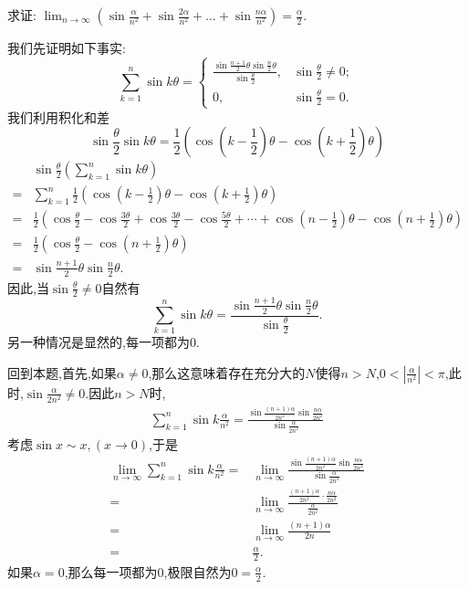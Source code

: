 \begin{exercise}[1.3.7]
    求证: $\lim_{n \to \infty} \left(\sin\frac{\alpha}{n^2} + \sin\frac{2\alpha}{n^2} + \dots + \sin\frac{n\alpha}{n^2}\right) = \frac{\alpha}{2}$.
\end{exercise}

\begin{solution}
    我们先证明如下事实:
    $$
        \sum_{k=1}^n \sin k \theta =\begin{cases}
            \frac{\sin\frac{n+1}{2}\theta\sin\frac{n}{2}\theta}{\sin \frac{\theta}{2}}, & \sin \frac{\theta}{2} \ne 0; \\
            0, & \sin \frac{\theta}{2} = 0.
        \end{cases}
    $$
    我们利用积化和差$$\sin \frac{\theta}{2}\sin k\theta = \frac{1}{2}\left(\cos\left(k-\frac{1}{2}\right)\theta-\cos\left(k+\frac{1}{2}\right)\theta\right)$$
    \begin{align*}
        &\sin \frac{\theta}{2}\left(\sum_{k=1}^n \sin k \theta \right)\\
        =&\sum_{k=1}^n \frac{1}{2}\left(\cos\left(k-\frac{1}{2}\right)\theta-\cos\left(k+\frac{1}{2}\right)\theta\right) \\
        =&\frac{1}{2}\left(\cos \frac{\theta}{2} -\cos \frac{3\theta}{2}+\cos \frac{3\theta}{2} -\cos \frac{5\theta}{2}+\cdots+ \cos\left(n-\frac{1}{2}\right)\theta-\cos\left(n+\frac{1}{2}\right)\theta\right) \\
        =&\frac{1}{2}\left(\cos \frac{\theta}{2} -\cos\left(n+\frac{1}{2}\right)\theta\right) \\
        =&\sin\frac{n+1}{2}\theta\sin\frac{n}{2}\theta.
    \end{align*}
    因此,当$ \sin \frac{\theta}{2}\neq 0$自然有$$
        \sum_{k=1}^n \sin k \theta =
            \frac{\sin\frac{n+1}{2}\theta\sin\frac{n}{2}\theta}{\sin \frac{\theta}{2}}.
    $$
    另一种情况是显然的,每一项都为$0$.
        
    回到本题,首先,如果$\alpha\neq 0$,那么这意味着存在充分大的$N$使得$n>N$,$0<\left|\frac{\alpha}{n^2}\right|<\pi$,此时,$\sin \frac{\alpha}{2n^2} \neq 0$.因此$n>N$时,
    \begin{align*}
        \sum_{k=1}^n \sin k \frac{\alpha}{n^2} =  \frac{\sin\frac{(n+1)\alpha}{2n^2}\sin\frac{n\alpha}{2n^2}}{\sin \frac{\alpha}{2n^2}}
    \end{align*}
    考虑$\sin x \sim x , (x \to 0)$,于是
    \begin{align*}
        \lim_{n\to\infty}\sum_{k=1}^n \sin k \frac{\alpha}{n^2} 
        =&\lim_{n \to \infty} \frac{\sin\frac{(n+1)\alpha}{2n^2}\sin\frac{n\alpha}{2n^2}}{\sin \frac{\alpha}{2n^2}}\\
        =&\lim_{n \to \infty} \frac{\frac{(n+1)\alpha}{2n^2}
        \cdot\frac{n\alpha}{2n^2}}{\frac{\alpha}{2n^2}}  \\
        =&\lim_{n \to \infty} \frac{(n+1)\alpha}{2n} \\
        =&\frac{\alpha}{2}.
    \end{align*}
    如果$\alpha = 0$,那么每一项都为$0$,极限自然为$0=\frac{\alpha}{2}$.
    

\end{solution}
